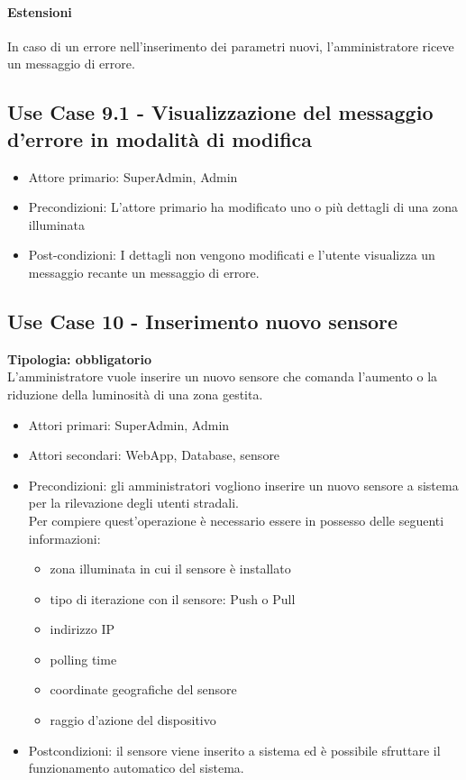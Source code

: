 \documentclass[12pt]{article}
\begin{document}
\paragraph{Estensioni} In caso di un errore nell'inserimento dei parametri nuovi, l'amministratore riceve un messaggio di errore.

\subsection{Use Case 9.1 - Visualizzazione del messaggio d'errore in modalità di modifica}
\begin{itemize}
	\item Attore primario: SuperAdmin, Admin
	\item Precondizioni: L'attore primario ha modificato uno o più dettagli di una zona illuminata
	\item Post-condizioni: I dettagli non vengono modificati e l'utente visualizza un messaggio recante un messaggio di errore.
\end{itemize}

\subsection{Use Case 10 - Inserimento nuovo sensore}
\textbf{Tipologia: obbligatorio}\\
L'amministratore vuole inserire un nuovo sensore che comanda l'aumento o la riduzione della luminosità di una zona gestita.
\begin{itemize}
	\item Attori primari: SuperAdmin, Admin
	\item Attori secondari: WebApp, Database, sensore
	\item Precondizioni: gli amministratori vogliono inserire un nuovo sensore a sistema per la rilevazione degli utenti stradali.\\
	 Per compiere quest'operazione è necessario essere in possesso delle seguenti informazioni: 
	\begin{itemize}
		\item zona illuminata in cui il sensore è installato
		\item tipo di iterazione con il sensore: Push o Pull
		\item indirizzo IP
		\item polling time
		\item coordinate geografiche del sensore
		\item raggio d'azione del dispositivo
	\end{itemize}
	\item Postcondizioni: il sensore viene inserito a sistema ed è possibile sfruttare il funzionamento automatico del sistema.
\end{itemize}
\end{document}
